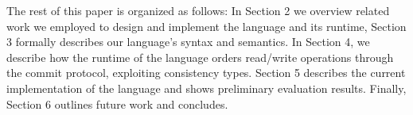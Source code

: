 The rest of this paper is organized as follows: In Section 2 we overview related
work we employed to design and implement the language and its runtime,
Section 3 formally describes our language's syntax and
semantics. In Section 4, we describe how the runtime of the language orders
read/write operations through the commit protocol, exploiting consistency types. 
Section 5 describes the current implementation of the language and shows preliminary evaluation
results. Finally, Section 6 outlines future work and concludes. 







